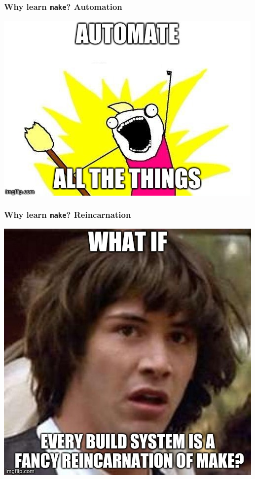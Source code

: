 \documentclass[xcolor=dvipsnames,t,compress]{beamer}
\begin{document}
\begin{frame}
\frametitle{Why learn \texttt{make}? Automation}
\centering
\includegraphics[scale=0.5]{images/all-the-things-meme.jpg}
\end{frame}

\begin{frame}
\frametitle{Why learn \texttt{make}? Reincarnation}
\centering
\includegraphics[scale=0.4]{images/what-if-meme.jpg}
\end{frame}
\end{document}

